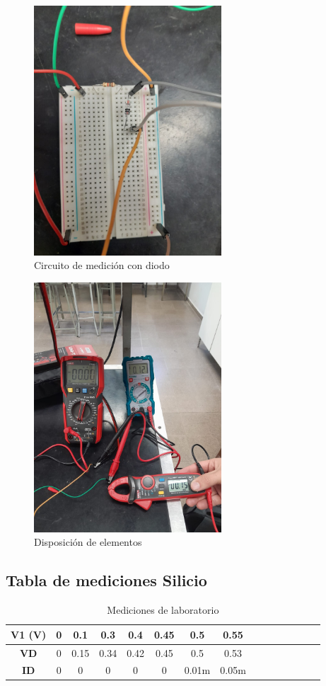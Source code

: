 \begin{figure}[H]
    \centering
    \includegraphics[width=7cm]{imagenes/proto1.jpg}
    \caption{Circuito de medición con diodo}
\end{figure}

\begin{figure}[H]
    \centering
    \includegraphics[width=7cm]{imagenes/elementos.jpg}
    \caption{Disposición de elementos}
\end{figure}


\subsection*{Tabla de mediciones Silicio}

\begin{table}[H]
\centering
\caption{Mediciones de laboratorio}
\begin{tabular}{|c|c|c|c|c|c|c|c|c|c|c|c|c|c|c|}
\hline
\textbf{V1 (V)} & 0 & 0.1 & 0.3 & 0.4 & 0.45 & 0.5 & 0.55\\
\hline
\textbf{VD} & 0 & 0.15 & 0.34 & 0.42 & 0.45 & 0.5 & 0.53\\
\hline
\textbf{ID} & 0 & 0 & 0 & 0 & 0 & 0.01m & 0.05m\\
\hline
\end{tabular}
\end{table}

